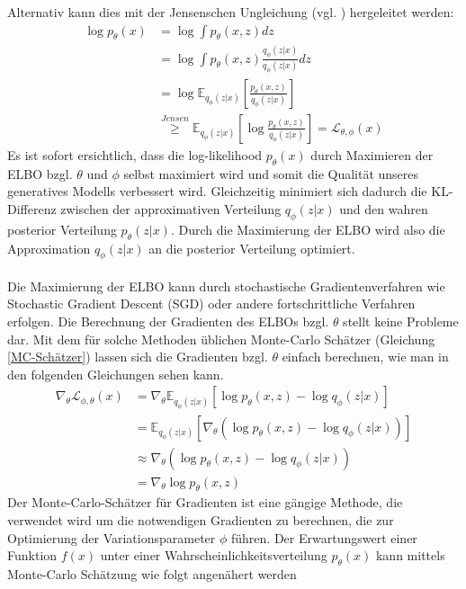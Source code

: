 \documentclass[%
thesis=student,%
coverpage=false,%
titlepage=false,%
headmarks=true, %
german,%
font=libertine, %
math=newpxtx, %
BCOR=5mm,%
coverBCOR=11mm%
]{tumbook}
\theoremstyle{break}
\begin{document}
Alternativ kann dies mit der Jensenschen Ungleichung (vgl. \cite{JensenscheUngleichung}) hergeleitet werden:
\begin{align}
	\log p_\theta(x) &= \log \int p_\theta(x,z) dz \\
	&= \log \int p_\theta(x,z) \frac{q_\phi(z|x)}{q_\phi(z|x)} dz \\
	& = \log \mathbb{E}_{q_\phi(z|x)}\left[\frac{p_\theta(x,z)}{q_\phi(z|x)}\right] \\
	& \overset{Jensen}{\geq} \mathbb{E}_{q_\phi(z|x)}\left[\log \frac{p_\theta(x,z)}{q_\phi(z|x)}\right] = \mathcal{L}_{\theta,\phi}(x)
\end{align}\noindent
Es ist sofort ersichtlich, dass die log-likelihood $p_\theta(x)$ durch Maximieren der ELBO bzgl. $\theta$ und  $\phi$ selbst maximiert wird und somit die Qualität unseres generatives Modells verbessert wird. Gleichzeitig minimiert sich dadurch die KL-Differenz zwischen der approximativen Verteilung $q_\phi(z|x)$ und den wahren posterior Verteilung $p_\theta(z|x)$. Durch die Maximierung der ELBO wird also die Approximation $q_\phi(z|x)$ an die posterior Verteilung optimiert. \\
\\
Die Maximierung der ELBO kann durch stochastische Gradientenverfahren wie Stochastic Gradient Descent (SGD) oder andere fortschrittliche Verfahren erfolgen. Die Berechnung der Gradienten des ELBOs bzgl. $\theta$ stellt keine Probleme dar. Mit dem für solche Methoden üblichen Monte-Carlo Schätzer (Gleichung \ref{MC-Schätzer}) lassen sich die Gradienten bzgl. $\theta$ einfach berechnen, wie man in den folgenden Gleichungen sehen kann.\\
\begin{align}
	\nabla_\theta \mathcal{L}_{\phi, \theta}(x) &=\nabla_\theta \mathbb{E}_{q_\phi(z|x)}[\log p_\theta(x,z)-\log q_\phi(z|x)] \\
	&=  \mathbb{E}_{q_\phi(z|x)}[\nabla_\theta (\log p_\theta(x,z)-\log q_\phi(z|x))] \\
	&\approx \nabla_\theta  (\log p_\theta(x,z)-\log q_\phi(z|x))\\
	&= \nabla_\theta  \log p_\theta(x,z) \label{MC-Schätzer}
\end{align}
Der Monte-Carlo-Schätzer für Gradienten ist eine gängige Methode, die verwendet wird um die notwendigen Gradienten zu berechnen, die zur Optimierung der Variationsparameter $\phi$ führen. Der Erwartungswert einer Funktion $f(x)$ unter einer Wahrscheinlichkeitsverteilung $p_\theta(x)$ kann mittels Monte-Carlo Schätzung wie folgt angenähert werden 
\end{document}
